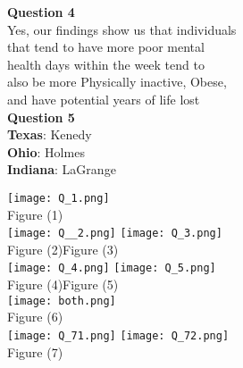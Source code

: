 \documentclass[a0paper, twocolumn, landscape]{baposter}
\begin{document}
\begin{poster}
{\begin{multicols}{2}
\textbf{Question 4}\\
Yes, our findings show us that individuals \\that tend to have more poor mental\\ health days within the week tend to\\ also be more Physically inactive, Obese,\\ and have potential years of life lost\\

\textbf{Question 5}\\
\textbf{Texas}: Kenedy\\
\textbf{Ohio}: Holmes\\
\textbf{Indiana}: LaGrange\\

\vspace{.2cm} %
\columnbreak

\texttt{[image: Q\_1.png]}\\
Figure (1)\\
\texttt{[image: Q\_\_2.png]}
\texttt{[image: Q\_3.png]}\\
Figure (2)\hspace{25mm}Figure (3)\\
\texttt{[image: Q\_4.png]} 
\texttt{[image: Q\_5.png]}\\
Figure (4)\hspace{25mm}Figure (5)\\
\texttt{[image: both.png]}\\
Figure (6)\\
\texttt{[image: Q\_71.png]}
\texttt{[image: Q\_72.png]}\\
Figure (7)\\

\end{multicols}




}


\end{poster}
\end{document}
